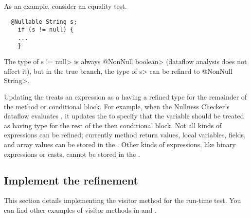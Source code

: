 \begin{enumerate}
As an example, consider an equality test.

\begin{Verbatim}
  @Nullable String s;
    if (s != null) {
    ...
    }
\end{Verbatim}

The type of \<s != null> is always \<@NonNull boolean> (dataflow analysis
does not affect it), but in the true branch, the type of \<s> can be
refined to \<@NonNull String>.


Updating the  treats an expression as a
having a refined type for the remainder of the method or conditional block. For
example, when the Nullness Checker's dataflow evaluates , it
updates the  to specify that the variable
 should be treated as having type  for the rest of the
then conditional block.  Not all kinds of expressions can be refined; currently
method return values, local variables, fields, and array values can be stored in
the .  Other kinds of expressions, like
binary expressions or casts, cannot be stored in the
.

\end{enumerate}


\subsection{Implement the refinement\label{dataflow-implement-refinement}}

\begin{sloppypar}
This section details implementing the visitor method
 for the 
run-time test.  You can find other examples of visitor methods in
 and
.
\end{sloppypar}

